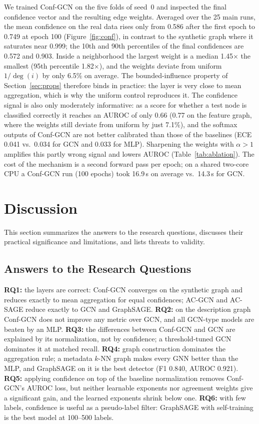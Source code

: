 \documentclass{csimq}
\begin{document}
We trained Conf-GCN on the five folds of seed~0 and inspected the final confidence vector and the resulting edge weights. Averaged over the 25 main runs, the mean confidence on the real data rises only from 0.586 after the first epoch to 0.749 at epoch 100 (Figure~\ref{fig:conf}), in contrast to the synthetic graph where it saturates near 0.999; the 10th and 90th percentiles of the final confidences are 0.572 and 0.903. Inside a neighborhood the largest weight is a median 1.45$\times$ the smallest (95th percentile 1.82$\times$), and the weights deviate from uniform $1/\deg(i)$ by only 6.5\% on average. The bounded-influence property of Section~\ref{sec:props} therefore binds in practice: the layer is very close to mean aggregation, which is why the uniform control reproduces it. The confidence signal is also only moderately informative: as a score for whether a test node is classified correctly it reaches an AUROC of only 0.66 (0.77 on the feature graph, where the weights still deviate from uniform by just 7.1\%), and the softmax outputs of Conf-GCN are not better calibrated than those of the baselines (ECE 0.041 vs.\ 0.034 for GCN and 0.033 for MLP). Sharpening the weights with $\alpha>1$ amplifies this partly wrong signal and lowers AUROC (Table~\ref{tab:ablation}). The cost of the mechanism is a second forward pass per epoch; on a shared two-core CPU a Conf-GCN run (100 epochs) took 16.9\,s on average vs.\ 14.3\,s for GCN.

\section{Discussion}

This section summarizes the answers to the research questions, discusses their practical significance and limitations, and lists threats to validity.

\subsection{Answers to the Research Questions}
\textbf{RQ1:} the layers are correct: Conf-GCN converges on the synthetic graph and reduces exactly to mean aggregation for equal confidences; AC-GCN and AC-SAGE reduce exactly to GCN and GraphSAGE. \textbf{RQ2:} on the description graph Conf-GCN does not improve any metric over GCN, and all GCN-type models are beaten by an MLP. \textbf{RQ3:} the differences between Conf-GCN and GCN are explained by its normalization, not by confidence; a threshold-tuned GCN dominates it at matched recall. \textbf{RQ4:} graph construction dominates the aggregation rule; a metadata $k$-NN graph makes every GNN better than the MLP, and GraphSAGE on it is the best detector (F1 0.840, AUROC 0.921). \textbf{RQ5:} applying confidence on top of the baseline normalization removes Conf-GCN's AUROC loss, but neither learnable exponents nor agreement weights give a significant gain, and the learned exponents shrink below one. \textbf{RQ6:} with few labels, confidence is useful as a pseudo-label filter: GraphSAGE with self-training is the best model at 100--500 labels.
\end{document}
